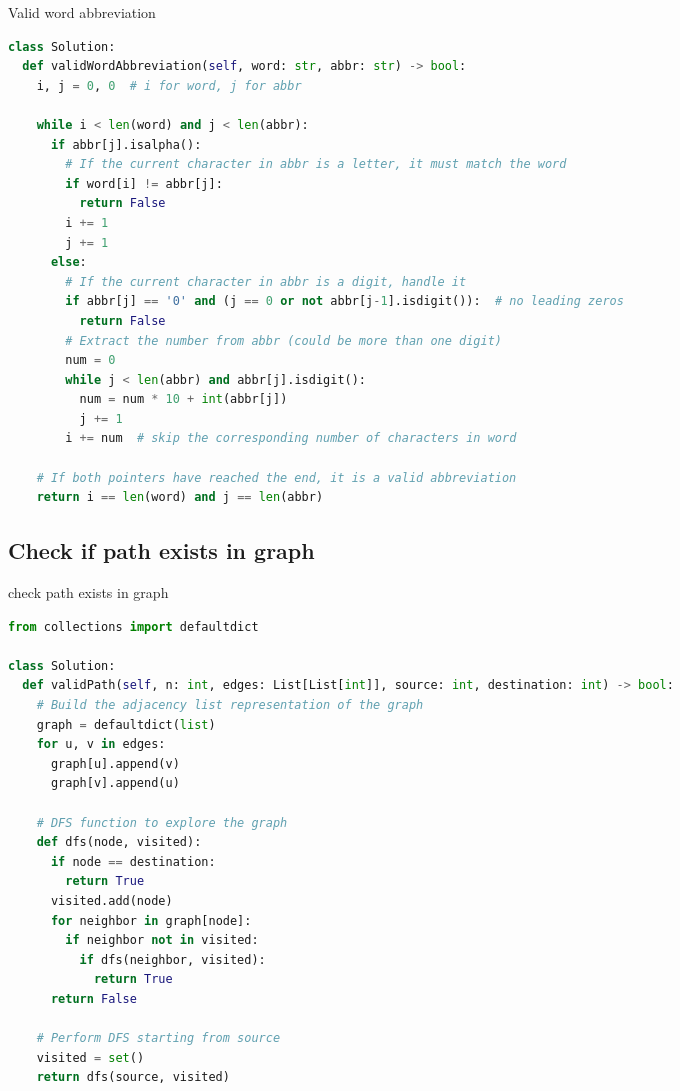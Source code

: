 \documentclass[a4paper,12pt]{article}
\begin{document}
\begin{multicols}{2}
\begin{mycode}[label={lst:valid-word-abbreviation}]{Valid word abbreviation}
\begin{lstlisting}[language=Python]
class Solution:
  def validWordAbbreviation(self, word: str, abbr: str) -> bool:
    i, j = 0, 0  # i for word, j for abbr
    
    while i < len(word) and j < len(abbr):
      if abbr[j].isalpha():
        # If the current character in abbr is a letter, it must match the word
        if word[i] != abbr[j]:
          return False
        i += 1
        j += 1
      else:
        # If the current character in abbr is a digit, handle it
        if abbr[j] == '0' and (j == 0 or not abbr[j-1].isdigit()):  # no leading zeros
          return False
        # Extract the number from abbr (could be more than one digit)
        num = 0
        while j < len(abbr) and abbr[j].isdigit():
          num = num * 10 + int(abbr[j])
          j += 1
        i += num  # skip the corresponding number of characters in word
    
    # If both pointers have reached the end, it is a valid abbreviation
    return i == len(word) and j == len(abbr)
\end{lstlisting}
\end{mycode}

\subsection{Check if path exists in graph}

\begin{mycode}[label={lst:path-existence}]{check path exists in graph}
\begin{lstlisting}[language=Python]
from collections import defaultdict

class Solution:
  def validPath(self, n: int, edges: List[List[int]], source: int, destination: int) -> bool:
    # Build the adjacency list representation of the graph
    graph = defaultdict(list)
    for u, v in edges:
      graph[u].append(v)
      graph[v].append(u)

    # DFS function to explore the graph
    def dfs(node, visited):
      if node == destination:
        return True
      visited.add(node)
      for neighbor in graph[node]:
        if neighbor not in visited:
          if dfs(neighbor, visited):
            return True
      return False

    # Perform DFS starting from source
    visited = set()
    return dfs(source, visited)
\end{lstlisting}
\end{mycode}


\end{multicols}
\end{document}
